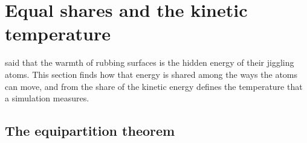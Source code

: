 \section{Equal shares and the kinetic temperature}
\label{sec:sm-equipartition}

 said that the warmth of rubbing surfaces is the
hidden energy of their jiggling atoms. This section finds how that energy
is shared among the ways the atoms can move, and from the share of the
kinetic energy defines the temperature that a simulation measures.

\subsection*{The equipartition theorem}

